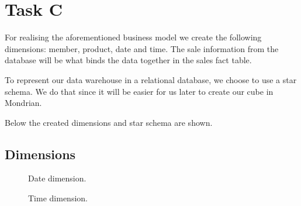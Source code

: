\section{Task C}
For realising the aforementioned business model we create the following dimensions:
member, product, date and time.
The sale information from the database will be what binds the data together in the sales fact table. 

To represent our data warehouse in a relational database, we choose to use a star schema.
We do that since it will be easier for us later to create our cube in Mondrian.

Below the created dimensions and star schema are shown.



\subsection{Dimensions}

\begin{figure}[H]
    \centering
    \begin{minipage}[b]{0.4\textwidth}
        \caption{Date dimension.}
        \label{fig:date_dim}
    \end{minipage}
    \begin{minipage}[b]{0.4\textwidth}
        \caption{Time dimension.}
        \label{fig:time_dim}
    \end{minipage}
\end{figure}

